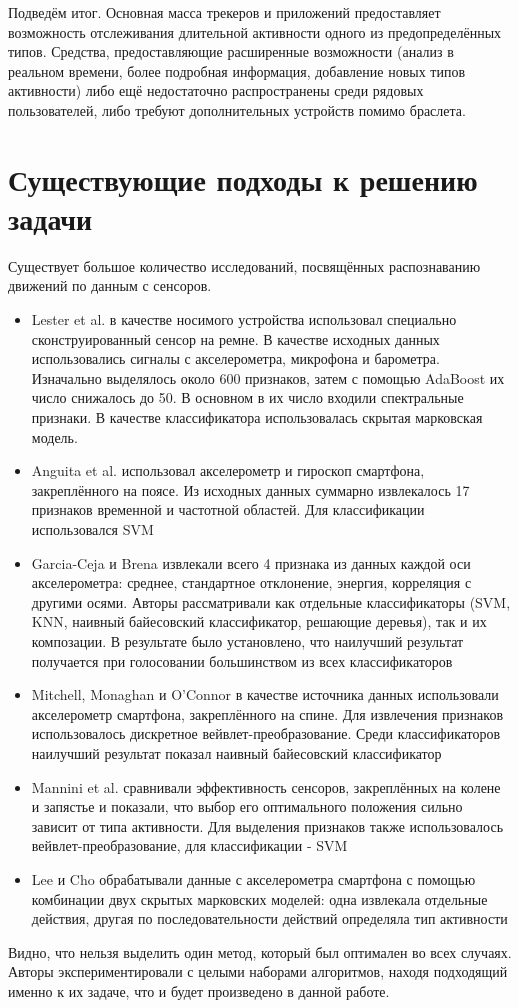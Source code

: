 Подведём итог. Основная масса трекеров и приложений предоставляет возможность отслеживания длительной активности одного из предопределённых типов. Средства, предоставляющие расширенные возможности (анализ в реальном времени, более подробная информация, добавление новых типов активности) либо ещё недостаточно распространены среди рядовых пользователей, либо требуют дополнительных устройств помимо браслета. 

\section{Существующие подходы к решению задачи}

Существует большое количество исследований, посвящённых распознаванию движений по данным с сенсоров. 
\begin{itemize}
\item Lester et al.\cite{review_lester} в качестве носимого устройства использовал специально сконструированный сенсор на ремне. В качестве исходных данных использовались сигналы с акселерометра, микрофона и барометра. Изначально выделялось около 600 признаков, затем с помощью AdaBoost их число снижалось до 50. В основном в их число входили спектральные признаки. В качестве классификатора использовалась скрытая марковская модель.
\item Anguita et al.\cite{review_anguita} использовал акселерометр и гироскоп смартфона, закреплённого на поясе. Из исходных данных суммарно извлекалось 17 признаков временной и частотной областей. Для классификации использовался SVM
\item Garcia-Ceja и Brena\cite{review_garcia} извлекали всего 4 признака из данных каждой оси акселерометра: среднее, стандартное отклонение, энергия, корреляция с другими осями. Авторы рассматривали как отдельные классификаторы (SVM, KNN, наивный байесовский классификатор, решающие деревья), так и их композации. В результате было установлено, что наилучший результат получается при голосовании большинством из всех классификаторов
\item Mitchell, Monaghan и O'Connor\cite{review_mitchell} в качестве источника данных использовали акселерометр смартфона, закреплённого на спине. Для извлечения признаков использовалось дискретное вейвлет-преобразование. Среди классификаторов наилучший результат показал наивный байесовский классификатор
\item Mannini et al.\cite{review_mannini} сравнивали эффективность сенсоров, закреплённых на колене и запястье и показали, что выбор его оптимального положения сильно зависит от типа активности. Для выделения признаков также использовалось вейвлет-преобразование, для классификации - SVM
\item Lee и Cho\cite{review_lee} обрабатывали данные с акселерометра смартфона с помощью комбинации двух скрытых марковских моделей: одна извлекала отдельные действия, другая по последовательности действий определяла тип активности
\end{itemize}

Видно, что нельзя выделить один метод, который был оптимален во всех случаях. Авторы экспериментировали с целыми наборами алгоритмов, находя подходящий именно к их задаче, что и будет произведено в данной работе. 



